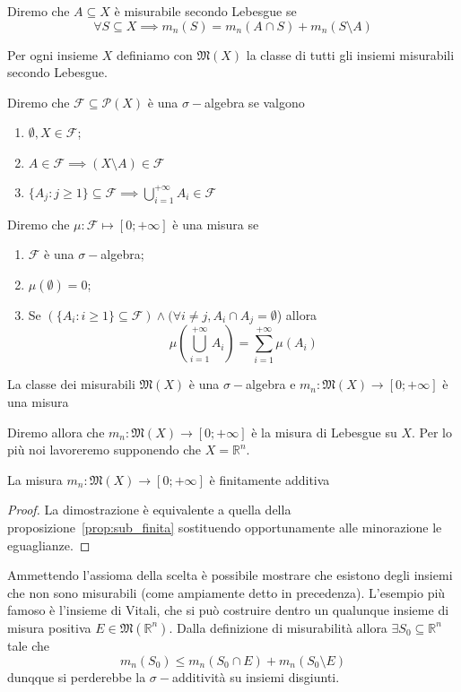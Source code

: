 \begin{definition}
	Diremo che $A \subseteq X$ è misurabile secondo Lebesgue se
	$$
	\forall S \subseteq X \implies m_n(S) = m_n(A \cap S) + m_n(S \setminus A)
	$$
	\label{def:mis_lebesgue}
\end{definition}
Per ogni insieme $X$ definiamo con $\mathfrak{M}(X)$ la classe di tutti gli insiemi misurabili secondo Lebesgue.
\begin{definition}
	Diremo che $\mathcal{F} \subseteq \mathcal{P}(X)$ è una $\sigma-$algebra se valgono
	\begin{enumerate}[label=\protect\circled{\arabic*}]
		\item $\emptyset, X \in \mathcal{F}$;
		\item $A \in \mathcal{F} \implies (X \setminus A) \in \mathcal{F}$
		\item $\{ A_j : j \geq 1 \} \subseteq \mathcal{F} \implies \bigcup\limits_{i=1}^{+\infty} A_i \in \mathcal{F}$
	\end{enumerate}
\end{definition}
\begin{definition}[misura]
	Diremo che $\mu: \mathcal{F} \mapsto [0; +\infty]$ è una misura se
	\begin{enumerate}[label=\protect\circled{\arabic*}]
		\item $\mathcal{F}$ è una $\sigma-$algebra;
		\item $\mu(\emptyset) = 0$;
		\item Se $( \{A_i : i \geq 1 \} \subseteq \mathcal{F}) \wedge (\forall i \neq j, A_i \cap A_j = \emptyset$) allora
		$$
			\mu \left( \bigcup_{i=1}^{+\infty} A_i \right) = \sum_{i=1}^{+\infty} \mu(A_i)
		$$
	\end{enumerate}
\end{definition}
\begin{theorem}
	La classe dei misurabili $\mathfrak{M}(X)$ è una $\sigma-$algebra e $m_n:\mathfrak{M}(X) \to [0; +\infty]$ è una misura
\end{theorem}
Diremo allora che $m_n: \mathfrak{M}(X) \to [0; +\infty]$ è la misura di Lebesgue su $X$. Per lo più noi lavoreremo supponendo che $X=\mathbb{R}^n$.
\begin{prop}
	La misura $m_n: \mathfrak{M}(X) \to [0; +\infty]$ è finitamente additiva
\end{prop}
\begin{proof}
La dimostrazione è equivalente a quella della proposizione~\ref{prop:sub_finita} sostituendo opportunamente alle minorazione le eguaglianze.
\end{proof}
\begin{remark}
Ammettendo l'assioma della scelta è possibile mostrare che esistono degli insiemi che non sono misurabili (come ampiamente detto in precedenza). L'esempio più famoso è
l'insieme di Vitali, che si può costruire dentro un qualunque insieme di misura positiva $E \in \mathfrak{M}(\mathbb{R}^n)$. Dalla definizione di misurabilità allora $\exists S_0 \subseteq \mathbb{R}^n$
tale che 
$$
m_n(S_0) \leq m_n(S_0 \cap E) + m_n(S_0 \setminus E)
$$
dunqque si perderebbe la $\sigma-$additività su insiemi disgiunti.
\end{remark}
